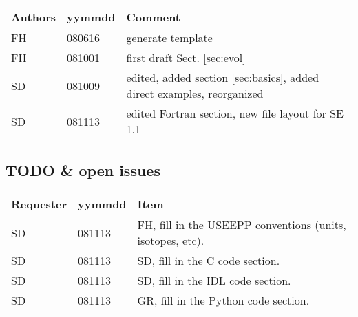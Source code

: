 \begin{tabular*}{\textwidth}{lll}
\hline
Authors & yymmdd & Comment \\
\hline
FH & 080616 & generate template \\
FH & 081001 & first draft Sect. \ref{sec:evol}  \\
SD & 081009 & edited, added section \ref{sec:basics}, added direct examples, reorganized \\
SD & 081113 & edited Fortran section, new file layout for SE 1.1\\
\hline
\end{tabular*}

\subsection{TODO \& open issues} 
\begin{tabular*}{\textwidth}{lll}
\hline
Requester & yymmdd & Item \\
\hline
SD & 081113 & FH, fill in the USEEPP conventions (units, isotopes, etc). \\
SD & 081113 & SD, fill in the C code section. \\
SD & 081113 & SD, fill in the IDL code section. \\
SD & 081113 & GR, fill in the Python code section. \\
\hline
\end{tabular*}





%
%
%
%

